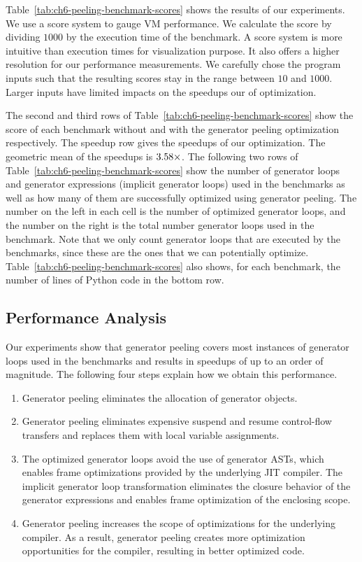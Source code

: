 Table~\ref{tab:ch6-peeling-benchmark-scores} shows the results of our experiments.
We use a score system to gauge VM performance.
We calculate the score by dividing $1000$ by the execution time of the benchmark.
A score system is more intuitive than execution times for visualization purpose.
It also offers a higher resolution for our performance measurements.
We carefully chose the program inputs such that the resulting scores stay in the range between $10$ and $1000$.
Larger inputs have limited impacts on the speedups our of optimization.

The second and third rows of Table~\ref{tab:ch6-peeling-benchmark-scores} show the score of each benchmark without and with the generator peeling optimization respectively.
The speedup row gives the speedups of our optimization.
The geometric mean of the speedups is $3.58{}\times$.
The following two rows of Table~\ref{tab:ch6-peeling-benchmark-scores} show the number of generator loops and generator expressions (implicit generator loops) used in the benchmarks as well as how many of them are successfully optimized using generator peeling.
The number on the left in each cell is the number of optimized generator loops, and the number on the right is the total number generator loops used in the benchmark.
Note that we only count generator loops that are executed by the benchmarks, since these are the ones that we can potentially optimize.
Table~\ref{tab:ch6-peeling-benchmark-scores} also shows, for each benchmark, the number of lines of Python code in the bottom row.

\subsection{Performance Analysis}

Our experiments show that generator peeling covers most instances of generator loops used in the benchmarks and results in speedups of up to an order of magnitude.
The following four steps explain how we obtain this performance.

\begin{enumerate}
\item Generator peeling eliminates the allocation of generator objects.
\item Generator peeling eliminates expensive suspend and resume control-flow transfers and replaces them with local variable assignments.
\item The optimized generator loops avoid the use of generator ASTs, which enables frame optimizations provided by the underlying JIT compiler.
The implicit generator loop transformation eliminates the closure behavior of the generator expressions and enables frame optimization of the enclosing scope.

\item Generator peeling increases the scope of optimizations for the underlying compiler.
As a result, generator peeling creates more optimization opportunities for the compiler, resulting in better optimized code.
\end{enumerate}

